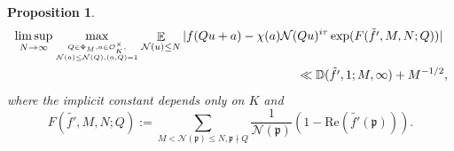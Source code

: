 \documentclass[11pt]{amsart}
\newtheorem{proposition}[lemma]{Proposition}
\theoremstyle{definition}
\DeclareMathOperator*{\E}{\mathbb{E}}
\newcommand{\D}{{\mathbb D}}
\newcommand{\NN}{{\mathcal N}}
\newcommand{\Z}{{\mathbb Z}}
\newcommand{\mf}{\mathfrak}
\begin{document}
\begin{proposition}
\begin{equation}\nonumber
    \begin{split}
       & \limsup_{N\to\infty}\max_{Q\in \Phi_{M}, a\in\mathcal{O}_K^{\times},\atop \NN(a)\leq \NN(Q), (a,Q)=1}\E_{ \NN(u)\leq N}\vert f(Qu+a)-\chi(a)\NN(Qu)^{i\tau}\exp(F(\tilde{f'},M,N;Q))\vert
     \\&\quad\quad\quad\quad\quad\quad\quad\quad\quad\quad\quad\quad\quad\quad\quad\quad\quad\quad\quad\quad\quad\quad\quad\ll \D(\tilde{f'},1;M,\infty)+M^{-1/2},
    \end{split}
\end{equation}
where  the implicit constant depends only on $K$ and
$$F(\tilde{f'},M,N;Q):=\sum_{M<\NN(\mf p)\leq N, \mf p \nmid Q}\frac{1}{\NN(\mf p)}(1-\text{Re}(\tilde{f'}(\mf p))).$$
 \end{proposition}

 
\end{document}
